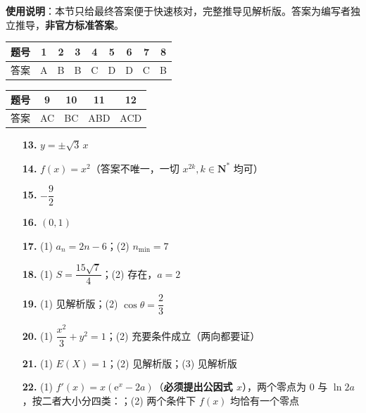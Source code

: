 
\begin{gknotice}
\textbf{使用说明}：本节只给最终答案便于快速核对，完整推导见解析版。答案为编写者独立推导，\textbf{非官方标准答案}。
\end{gknotice}

\begin{center}\begin{tabular}{ccccccccc}
\toprule
题号 & 1 & 2 & 3 & 4 & 5 & 6 & 7 & 8 \\
\midrule
答案 & A & B & B & C & D & D & C & B \\
\bottomrule
\end{tabular}\end{center}

\begin{center}\begin{tabular}{ccccc}
\toprule
题号 & 9 & 10 & 11 & 12 \\
\midrule
答案 & AC & BC & ABD & ACD \\
\bottomrule
\end{tabular}\end{center}

\begin{itemize}[leftmargin=2.6em]
  \item[\textbf{13.}] $y=\pm\sqrt3\,x$
  \item[\textbf{14.}] $f(x)=x^{2}$（答案不唯一，一切 $x^{2k},k\in\mathbf N^{*}$ 均可）
  \item[\textbf{15.}] $-\dfrac92$
  \item[\textbf{16.}] $(0,1)$
\end{itemize}

\begin{itemize}[leftmargin=2.6em]
  \item[\textbf{17.}] (1) $a_n=2n-6$；(2) $n_{\min}=7$
  \item[\textbf{18.}] (1) $S=\dfrac{15\sqrt7}4$；(2) 存在，$a=2$
  \item[\textbf{19.}] (1) 见解析版；(2) $\cos\theta=\dfrac23$
  \item[\textbf{20.}] (1) $\dfrac{x^{2}}3+y^{2}=1$；(2) 充要条件成立（两向都要证）
  \item[\textbf{21.}] (1) $E(X)=1$；(2) 见解析版；(3) 见解析版
  \item[\textbf{22.}] (1) $f'(x)=x\left(\mathrm e^{x}-2a\right)$（\textbf{必须提出公因式 $x$}），两个零点为 $0$ 与 $\ln2a$，按二者大小分四类：；(2) 两个条件下 $f(x)$ 均恰有一个零点
\end{itemize}
